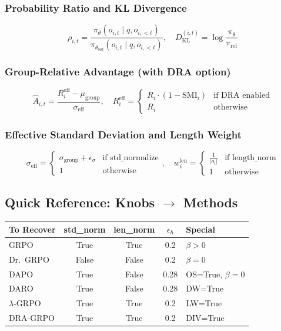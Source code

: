 \documentclass[11pt,a4paper]{article}
\begin{document}
\subsubsection{Probability Ratio and KL Divergence}
\begin{equation}
\rho_{i,t} = \frac{\pi_{\theta}(o_{i,t} \mid q, o_{i,<t})}{\pi_{\theta_{\text{old}}}(o_{i,t} \mid q, o_{i,<t})}, \quad D_{\text{KL}}^{(i,t)} = \log \frac{\pi_{\theta}}{\pi_{\text{ref}}}
\end{equation}

\subsubsection{Group-Relative Advantage (with DRA option)}
\begin{equation}
\hat{A}_{i,t} = \frac{R_i^{\text{eff}} - \mu_{\text{group}}}{\sigma_{\text{eff}}}, \quad R_i^{\text{eff}} = \begin{cases}
R_i \cdot (1 - \text{SMI}_i) & \text{if DRA enabled} \\
R_i & \text{otherwise}
\end{cases}
\end{equation}

\subsubsection{Effective Standard Deviation and Length Weight}
\begin{equation}
\sigma_{\text{eff}} = \begin{cases}
\sigma_{\text{group}} + \epsilon_\sigma & \text{if std\_normalize} \\
1 & \text{otherwise}
\end{cases}, \quad
w_i^{\text{len}} = \begin{cases}
\frac{1}{|o_i|} & \text{if length\_norm} \\
1 & \text{otherwise}
\end{cases}
\end{equation}

\subsection{Quick Reference: Knobs $\to$ Methods}

\begin{center}
\begin{tabular}{@{}lcccl@{}}
\toprule
\textbf{To Recover} & \textbf{std\_norm} & \textbf{len\_norm} & $\epsilon_h$ & \textbf{Special} \\
\midrule
GRPO & True & True & 0.2 & $\beta > 0$ \\
Dr.~GRPO & False & False & 0.2 & $\beta = 0$ \\
DAPO & True & False & 0.28 & OS=True, $\beta=0$ \\
DARO & True & False & 0.28 & DW=True \\
$\lambda$-GRPO & True & True & 0.2 & LW=True \\
DRA-GRPO & True & True & 0.2 & DIV=True \\
\bottomrule
\end{tabular}
\end{center}
\end{document}
